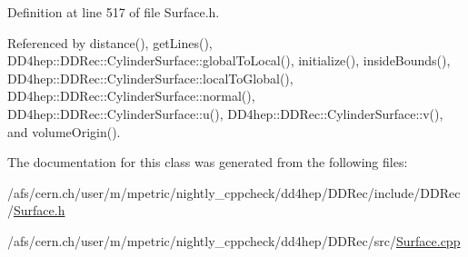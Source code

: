 Definition at line 517 of file Surface.\+h.



Referenced by distance(), get\+Lines(), D\+D4hep\+::\+D\+D\+Rec\+::\+Cylinder\+Surface\+::global\+To\+Local(), initialize(), inside\+Bounds(), D\+D4hep\+::\+D\+D\+Rec\+::\+Cylinder\+Surface\+::local\+To\+Global(), D\+D4hep\+::\+D\+D\+Rec\+::\+Cylinder\+Surface\+::normal(), D\+D4hep\+::\+D\+D\+Rec\+::\+Cylinder\+Surface\+::u(), D\+D4hep\+::\+D\+D\+Rec\+::\+Cylinder\+Surface\+::v(), and volume\+Origin().



The documentation for this class was generated from the following files\+:\begin{DoxyCompactItemize}
\item 
/afs/cern.\+ch/user/m/mpetric/nightly\+\_\+cppcheck/dd4hep/\+D\+D\+Rec/include/\+D\+D\+Rec/\hyperlink{_surface_8h}{Surface.\+h}\item 
/afs/cern.\+ch/user/m/mpetric/nightly\+\_\+cppcheck/dd4hep/\+D\+D\+Rec/src/\hyperlink{_surface_8cpp}{Surface.\+cpp}\end{DoxyCompactItemize}
